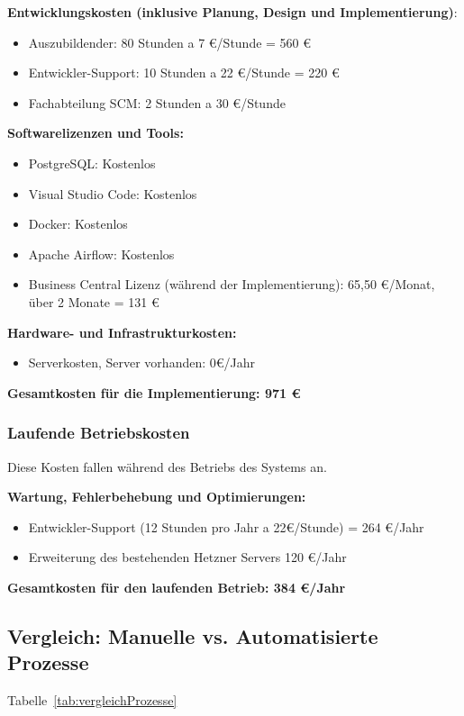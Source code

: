 	\textbf{Entwicklungskosten (inklusive Planung, Design und Implementierung)}:
    \begin{itemize}
        \item Auszubildender: 80 Stunden a 7 €/Stunde = 560 €
        \item Entwickler-Support: 10 Stunden a 22 €/Stunde = 220 €
        \item Fachabteilung SCM: 2 Stunden a 30 €/Stunde
    \end{itemize}
    \clearpage

	\textbf{Softwarelizenzen und Tools:}
    \begin{itemize}
        \item PostgreSQL: Kostenlos
        \item Visual Studio Code: Kostenlos
        \item Docker: Kostenlos
        \item Apache Airflow: Kostenlos
        \item Business Central Lizenz (während der Implementierung): 65,50 €/Monat, über 2 Monate = 131 € 
    \end{itemize}

	\textbf{Hardware- und Infrastrukturkosten:}
    \begin{itemize}
        \item Serverkosten, Server vorhanden: 0€/Jahr
    \end{itemize}
        
	\textbf{Gesamtkosten für die Implementierung: 971 €}

\subsubsection{Laufende Betriebskosten}
\label{Betriebskosten}

Diese Kosten fallen während des Betriebs des Systems an.

\textbf{Wartung, Fehlerbehebung und Optimierungen:}
\begin{itemize}
    \item Entwickler-Support (12 Stunden pro Jahr a 22€/Stunde) = 264 €/Jahr
    \item Erweiterung des bestehenden Hetzner Servers 120 €/Jahr
\end{itemize}

\textbf{Gesamtkosten für den laufenden Betrieb: 384 €/Jahr }

\clearpage

\subsection{Vergleich: Manuelle vs. Automatisierte Prozesse}
\label{vergleichProzesse}
Tabelle~\ref{tab:vergleichProzesse}
\\



















